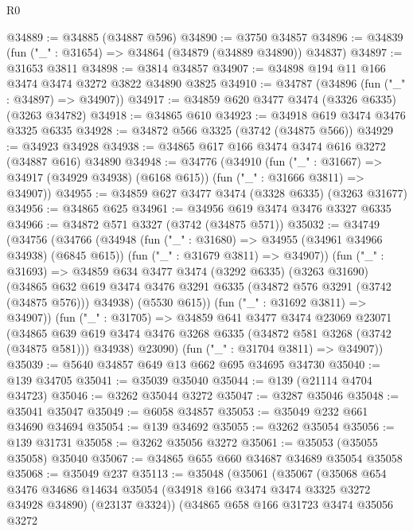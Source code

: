 \begin{lexlean}{R0}
\begin{coremodule}
@34889 := @34885 (@34887 @596)
@34890 := @3750 @34857
@34896 := @34839 (fun ("_" : @31654) => @34864 (@34879 (@34889 @34890)) @34837)
@34897 := @31653 @3811
@34898 := @3814 @34857
@34907 := @34898 @194 @11 @166 @3474 @3474 @3272 @3822 @34890 @3825
@34910 := @34787 (@34896 (fun ("_" : @34897) => @34907))
@34917 := @34859 @620 @3477 @3474 (@3326 @6335) (@3263 @34782)
@34918 := @34865 @610
@34923 := @34918 @619 @3474 @3476 @3325 @6335
@34928 := @34872 @566 @3325 (@3742 (@34875 @566))
@34929 := @34923 @34928
@34938 := @34865 @617 @166 @3474 @3474 @616 @3272 (@34887 @616) @34890
@34948 := @34776
    (@34910
      (fun ("_" : @31667) => @34917 (@34929 @34938) (@6168 @615))
      (fun ("_" : @31666 @3811) => @34907))
@34955 := @34859 @627 @3477 @3474 (@3328 @6335) (@3263 @31677)
@34956 := @34865 @625
@34961 := @34956 @619 @3474 @3476 @3327 @6335
@34966 := @34872 @571 @3327 (@3742 (@34875 @571))
@35032 := @34749
    (@34756
      (@34766
        (@34948
          (fun ("_" : @31680) => @34955 (@34961 @34966 @34938) (@6845 @615))
          (fun ("_" : @31679 @3811) => @34907))
        (fun ("_" : @31693) =>
        @34859
          @634
          @3477
          @3474
          (@3292 @6335)
          (@3263 @31690)
          (@34865
            @632
            @619
            @3474
            @3476
            @3291
            @6335
            (@34872 @576 @3291 (@3742 (@34875 @576)))
            @34938)
          (@5530 @615))
        (fun ("_" : @31692 @3811) => @34907))
      (fun ("_" : @31705) =>
      @34859
        @641
        @3477
        @3474
        @23069
        @23071
        (@34865 @639 @619 @3474 @3476 @3268 @6335 (@34872 @581 @3268 (@3742 (@34875 @581))) @34938)
        @23090)
      (fun ("_" : @31704 @3811) => @34907))
@35039 := @5640 @34857 @649 @13 @662 @695 @34695 @34730
@35040 := @139 @34705
@35041 := @35039 @35040
@35044 := @139 (@21114 @4704 @34723)
@35046 := @3262 @35044 @3272
@35047 := @3287 @35046
@35048 := @35041 @35047
@35049 := @6058 @34857
@35053 := @35049 @232 @661 @34690 @34694
@35054 := @139 @34692
@35055 := @3262 @35054
@35056 := @139 @31731
@35058 := @3262 @35056 @3272
@35061 := @35053 (@35055 @35058) @35040
@35067 := @34865 @655 @660 @34687 @34689 @35054 @35058
@35068 := @35049 @237
@35113 := @35048
    (@35061
      (@35067
        (@35068
          @654
          @3476
          @34686
          @14634
          @35054
          (@34918 @166 @3474 @3474 @3325 @3272 @34928 @34890)
          (@23137 @3324))
        (@34865
          @658
          @166
          @31723
          @3474
          @35056
          @3272

\end{coremodule}
\end{lexlean}

